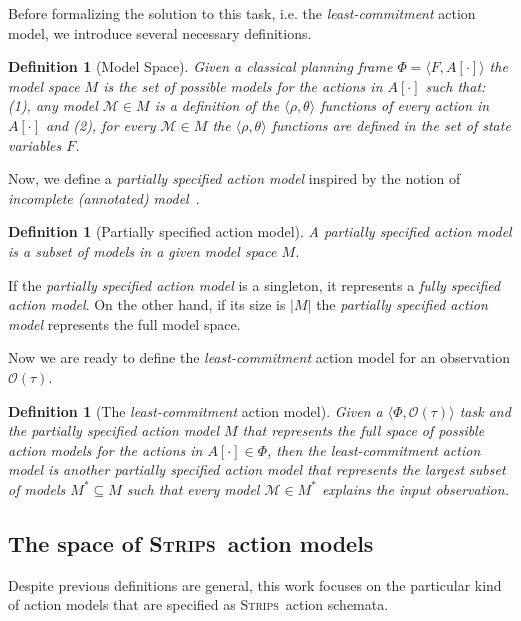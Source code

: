 \documentclass{article}
\newcommand{\tup}[1]{{\langle #1 \rangle}}
\newcommand{\strips}{\textsc{Strips}}
\newtheorem{definition}[theorem]{Definition}
\begin{document}
Before formalizing the solution to this task, i.e. the {\em least-commitment} action model, we introduce several necessary definitions. 

\begin{definition}[Model Space]
Given a {\em classical planning frame} $\Phi=\tup{F,A[\cdot]}$ the model space $M$ is the set of possible models for the actions in $A[\cdot]$ such that: (1), any model $\mathcal{M}\in M$ is a definition of the $\tup{\rho,\theta}$ functions of every action in $A[\cdot]$ and (2), for every $\mathcal{M}\in M$ the $\tup{\rho,\theta}$ functions are defined in the set of state variables $F$. 
\end{definition}

Now, we define a {\em partially specified action model} inspired by the notion of {\em incomplete (annotated) model}~\cite{sreedharan2018handling}.
\begin{definition}[Partially specified action model]
A {\em partially specified action model} is a subset of models in a given {\em model space $M$}.
\end{definition}
If the {\em partially specified action model} is a singleton, it represents a {\em fully specified action model}. On the other hand, if its size is $|M|$ the {\em partially specified action model} represents the full model space.

Now we are ready to define the {\em least-commitment} action model for an observation $\mathcal{O}(\tau)$.
\begin{definition}[The {\em least-commitment} action model]
Given a $\tup{\Phi,\mathcal{O}(\tau)}$ task and the {\em partially specified action model} $M$ that represents the full space of possible action models for the actions in $A[\cdot]\in \Phi$, then the {\em least-commitment} action model is another {\em partially specified action model} that represents the largest subset of models $M^*\subseteq M$ such that every model $\mathcal{M}\in M^*$ {\em explains} the input observation.
\end{definition}

\subsection{The space of \strips\ action models}
Despite previous definitions are general, this work focuses on the particular kind of action models that are specified as \strips\ action schemata. 
\end{document}
